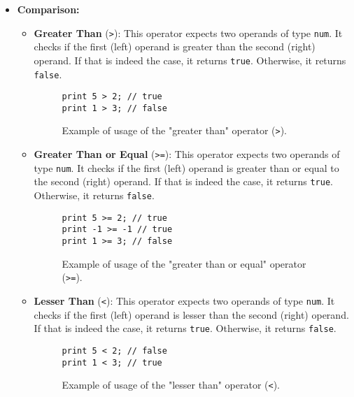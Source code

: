 \begin{itemize}
\begin{itemize}
\begin{itemize}
                
                \end{itemize}
                
            \item \textbf{Comparison:}
                \begin{itemize}
                    \item \textbf{Greater Than} (\texttt{>}): This operator expects two operands of type \texttt{num}. It checks if the first (left) operand is greater than the second (right) operand. If that is indeed the case, it returns \texttt{true}. Otherwise, it returns \texttt{false}.
                    \begin{figure}[H]
                        \centering
                        \begin{lstlisting}
print 5 > 2; // true
print 1 > 3; // false
                        \end{lstlisting}
                        \caption{Example of usage of the "greater than" operator (\texttt{>}).}
                    \end{figure}

                    \item \textbf{Greater Than or Equal} (\texttt{>=}): This operator expects two operands of type \texttt{num}. It checks if the first (left) operand is greater than or equal to the second (right) operand. If that is indeed the case, it returns \texttt{true}. Otherwise, it returns \texttt{false}.
                    \begin{figure}[H]
                        \centering
                        \begin{lstlisting}
print 5 >= 2; // true
print -1 >= -1 // true
print 1 >= 3; // false
                        \end{lstlisting}
                        \caption{Example of usage of the "greater than or equal" operator (\texttt{>=}).}
                    \end{figure}

                    \item \textbf{Lesser Than} (\texttt{<}): This operator expects two operands of type \texttt{num}. It checks if the first (left) operand is lesser than the second (right) operand. If that is indeed the case, it returns \texttt{true}. Otherwise, it returns \texttt{false}.
                    \begin{figure}[H]
                        \centering
                        \begin{lstlisting}
print 5 < 2; // false
print 1 < 3; // true
                        \end{lstlisting}
                        \caption{Example of usage of the "lesser than" operator (\texttt{<}).}
                    \end{figure}


\end{itemize}
\end{itemize}
\end{itemize}
